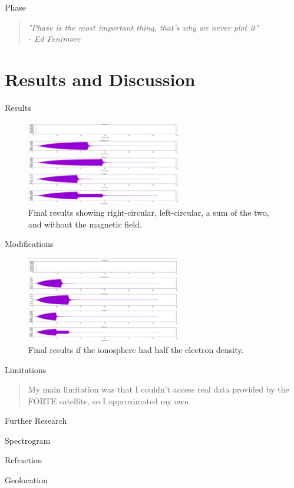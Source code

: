 \documentclass[10pt, aspectratio=168]{beamer}
\begin{document}
    
    \begin{frame}{Phase}
    \begin{quote}
        \huge{\textit{"Phase is the most important thing, that's why we never plot it" \\ - Ed Fenimore}}
    \end{quote}
        
    \end{frame}
    
\section{Results and Discussion}
    \begin{frame}{Results}
    \begin{figure}[h]
    \centering
    \includegraphics[width=0.6\textwidth]{signal_final_results.png}
    \caption{Final results showing right-circular, left-circular, a sum of the two, and without the magnetic field.}
    \label{fig:final-results}
    \end{figure}
    \end{frame}
    \begin{frame}{Modifications}
        \begin{figure}[h]
    \centering
    \includegraphics[width=0.6\textwidth]{signal_stec_15.png}
    \caption{Final results if the ionosphere had half the electron density.}
    \label{fig:stec-15}
    \end{figure}
    \end{frame}
    \begin{frame}{Limitations}
    \begin{quote}
        \Large{My main limitation was that I couldn't access real data provided by the FORTE satellite, so I approximated my own.}
    \end{quote}
    \end{frame}
    \begin{frame}{Further Research}
        \begin{itemize}
            \item \huge{Spectrogram
            \item Refraction
            \item Geolocation}
        \end{itemize}
    \end{frame}
   
\end{document}
